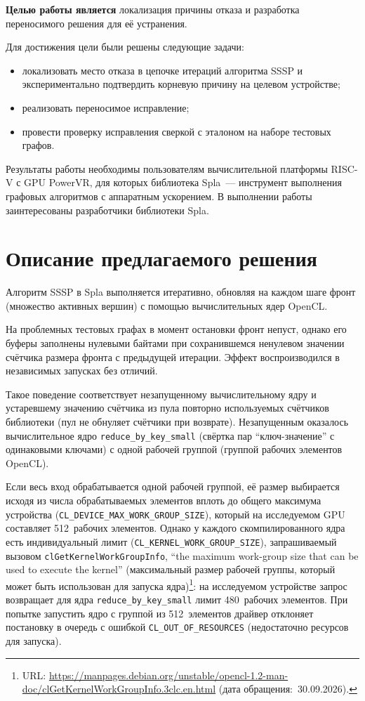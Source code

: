 \documentclass[a4paper]{article}
\begin{document}
\textbf{Целью работы является} локализация причины отказа и разработка переносимого решения для её устранения.

Для достижения цели были решены следующие задачи:
\begin{itemize}
    \item локализовать место отказа в цепочке итераций алгоритма SSSP и экспериментально подтвердить корневую причину на целевом устройстве;
    \item реализовать переносимое исправление;
    \item провести проверку исправления сверкой с эталоном на наборе тестовых графов.
\end{itemize}

Результаты работы необходимы пользователям вычислительной платформы RISC-V с GPU PowerVR, для которых библиотека Spla~--- инструмент выполнения графовых алгоритмов с аппаратным ускорением. В выполнении работы заинтересованы разработчики библиотеки Spla.

\section{Описание предлагаемого решения}

Алгоритм SSSP в Spla выполняется итеративно, обновляя на каждом шаге фронт (множество активных вершин) с помощью вычислительных ядер OpenCL.

На проблемных тестовых графах в момент остановки фронт непуст, однако его буферы заполнены нулевыми байтами при сохранившемся ненулевом значении счётчика размера фронта с предыдущей итерации. Эффект воспроизводился в независимых запусках без отличий.

Такое поведение соответствует незапущенному вычислительному ядру и устаревшему значению счётчика из пула повторно используемых счётчиков библиотеки (пул не обнуляет счётчики при возврате). Незапущенным оказалось вычислительное ядро \texttt{reduce\_by\_key\_small} (свёртка пар \enquote{ключ-значение} с одинаковыми ключами) с одной рабочей группой (группой рабочих элементов OpenCL).

Если весь вход обрабатывается одной рабочей группой, её размер выбирается исходя из числа обрабатываемых элементов вплоть до общего максимума устройства (\texttt{CL\_DEVICE\_MAX\_WORK\_GROUP\_SIZE}), который на исследуемом GPU составляет 512~рабочих элементов. Однако у каждого скомпилированного ядра есть индивидуальный лимит (\texttt{CL\_KERNEL\_WORK\_GROUP\_SIZE}), запрашиваемый вызовом \texttt{clGetKernelWorkGroupInfo}, \foreignquote{english}{the maximum work-group size that can be used to execute the kernel} (максимальный размер рабочей группы, который может быть использован для запуска ядра)\footnote{URL: \url{https://manpages.debian.org/unstable/opencl-1.2-man-doc/clGetKernelWorkGroupInfo.3clc.en.html} (дата обращения:~30.09.2026).}: на исследуемом устройстве запрос возвращает для ядра \texttt{reduce\_by\_key\_small} лимит 480~рабочих элементов. При попытке запустить ядро с группой из 512~элементов драйвер отклоняет постановку в очередь с ошибкой \texttt{CL\_OUT\_OF\_RESOURCES} (недостаточно ресурсов для запуска).
\end{document}
